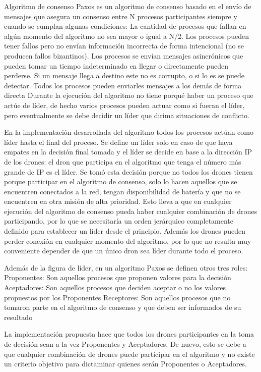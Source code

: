 Algoritmo de consenso
Paxos es un algoritmo de consenso basado en el envío de mensajes que asegura un consenso entre N procesos participantes siempre y cuando se cumplan algunas condiciones:
La cantidad de procesos que fallan en algún momento del algoritmo no sea mayor o igual a N/2.
Los procesos pueden tener fallos pero no envían información incorrecta de forma intencional (no se producen fallos bizantinos).
Los procesos se envían mensajes asincrónicos que pueden tomar un tiempo indeterminado en llegar o directamente pueden perderse.
Si un mensaje llega a destino este no es corrupto, o si lo es se puede detectar.
Todos los procesos pueden enviarles mensajes a los demás de forma directa
Durante la ejecución del algoritmo no tiene porqué haber un proceso que actúe de líder, de hecho varios procesos pueden actuar como si fueran el líder, pero eventualmente se debe decidir un líder que dirima situaciones de conflicto.

En la implementación desarrollada del algoritmo todos los procesos actúan como líder hasta el final del proceso. Se define un líder solo en caso de que haya empates en la decisión final tomada y el líder se decide en base a la dirección IP de los drones: el dron que participa en el algoritmo que tenga el número más grande de IP es el líder. Se tomó esta decisión porque no todos los drones tienen porque participar en el algoritmo de consenso, solo lo hacen aquellos que se encuentren conectados a la red, tengan disponibilidad de batería y que no se encuentren en otra misión de alta prioridad. Esto lleva a que en cualquier ejecución del algoritmo de consenso pueda haber cualquier combinación de drones participando, por lo que se necesitaría un orden jerárquico completamente definido para establecer un líder desde el principio. Además los drones pueden perder conexión en cualquier momento del algoritmo, por lo que no resulta muy conveniente depender de que un único dron sea líder durante todo el proceso.

Además de la figura de líder, en un algoritmo Paxos se definen otros tres roles:
Proponentes: Son aquellos procesos que proponen valores para la decisión
Aceptadores: Son aquellos procesos que deciden aceptar o no los valores propuestos por los Proponentes
Receptores: Son aquellos procesos que no tomaron parte en el algoritmo de consenso y que deben ser informados de su resultado

La implementación propuesta hace que todos los drones participantes en la toma de decisión sean a la vez Proponentes y Aceptadores. De nuevo, esto se debe a que cualquier combinación de drones puede participar en el algoritmo y no existe un criterio objetivo para dictaminar quienes serán Proponentes o Aceptadores.

